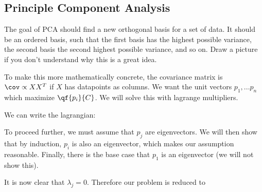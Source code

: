 \documentclass[12pt]{article}
\begin{document}
\subsection{Principle Component Analysis}

The goal of PCA should find a new orthogonal basis for a set of data. It should be an ordered basis, such that the first basis has the highest possible variance, the second basis the second highest possible variance, and so on. Draw a picture if you don't understand why this is a great idea. 

To make this more mathematically concrete, the covariance matrix is $\cov \propto XX^T$ if $X$ has datapoints as columns. We want the unit vectors $p_1, ... p_n$ which maximize $\qf{p_i}{C}$. We will solve this with lagrange multipliers.


We can write the lagrangian:



To proceed further, we must assume that $p_j$ are eigenvectors. We will then show that by induction, $p_i$ is also an eigenvector, which makes our assumption reasonable. Finally, there is the base case that $p_1$ is an eigenvector (we will not show this).


It is now clear that $\lambda_j = 0$. Therefore our problem is reduced to

\end{document}

